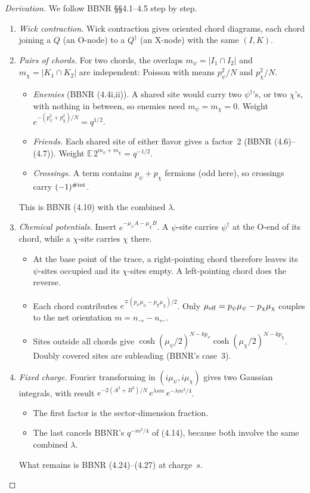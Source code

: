 \documentclass[11pt]{article}
\theoremstyle{plain}
\theoremstyle{remark}
\numberwithin{equation}{section}
\begin{document}
\begin{proof}[Derivation]
We follow BBNR \S\S4.1--4.5 step by step.
\begin{enumerate}\itemsep2pt
\item \emph{Wick contraction.} Wick contraction gives oriented chord diagrams, each chord joining a $Q$ (an O-node) to a
  $Q^\dagger$ (an X-node) with the same $(I,K)$.
\item \emph{Pairs of chords.} For two chords, the overlaps $m_\psi=|I_1\cap I_2|$ and $m_\chi=|K_1\cap K_2|$ are
  independent: Poisson with means $p_\psi^2/N$ and $p_\chi^2/N$.
  \begin{itemize}\itemsep1pt
  \item \emph{Enemies} (BBNR (4.4i,ii)). A shared site would carry two $\psi^\dagger$'s, or two $\chi$'s, with nothing in
    between, so enemies need $m_\psi=m_\chi=0$. Weight $e^{-(p_\psi^2+p_\chi^2)/N}=q^{1/2}$.
  \item \emph{Friends.} Each shared site of either flavor gives a factor~2 (BBNR (4.6)--(4.7)). Weight
    $\mathbb E\,2^{m_\psi+m_\chi}=q^{-1/2}$.
  \item \emph{Crossings.} A term contains $p_\psi+p_\chi$ fermions (odd here), so crossings carry $(-1)^{\#\rm int}$.
  \end{itemize}
  This is BBNR (4.10) with the combined $\lambda$.
\item \emph{Chemical potentials.} Insert $e^{-\mu_\psi A-\mu_\chi B}$. A $\psi$-site carries $\psi^\dagger$ at the
  O-end of its chord, while a $\chi$-site carries $\chi$ there.
  \begin{itemize}\itemsep1pt
  \item At the base point of the trace, a right-pointing chord therefore leaves its $\psi$-sites occupied and its
    $\chi$-sites empty. A left-pointing chord does the reverse.
  \item Each chord contributes $e^{\mp(p_\psi\mu_\psi-p_\chi\mu_\chi)/2}$. Only $\mu_{\rm eff}=p_\psi\mu_\psi-p_\chi\mu_\chi$
    couples to the net orientation $m=n_\to-n_\leftarrow$.
  \item Sites outside all chords give $\cosh(\mu_\psi/2)^{N-kp_\psi}\cosh(\mu_\chi/2)^{N-kp_\chi}$. Doubly covered sites
    are subleading (BBNR's case~3).
  \end{itemize}
\item \emph{Fixed charge.} Fourier transforming in $(i\mu_\psi,i\mu_\chi)$ gives two Gaussian integrals, with result
  $e^{-2(A^2+B^2)/N}\,e^{\lambda sm}\,e^{-\lambda m^2/4}$.
  \begin{itemize}\itemsep1pt
  \item The first factor is the sector-dimension fraction.
  \item The last cancels BBNR's $q^{-m^2/4}$ of (4.14), because both involve the same combined $\lambda$.
  \end{itemize}
  What remains is BBNR (4.24)--(4.27) at charge~$s$.\qedhere
\end{enumerate}
\end{proof}
\end{document}
